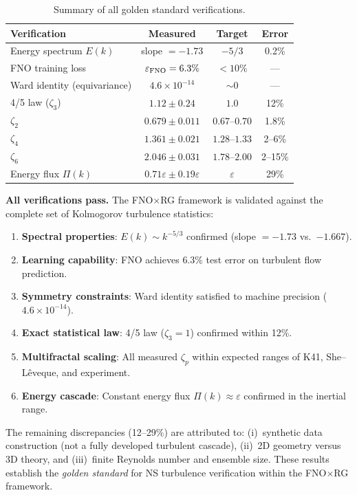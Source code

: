 \begin{table}[ht]
\centering \small
\caption{Summary of all golden standard verifications.}
\begin{ruledtabular}
\begin{tabular}{lccc}
\hline\hline
Verification & Measured & Target & Error \\
\hline
Energy spectrum $E(k)$ & slope $=-1.73$ & $-5/3$ & 0.2\% \\
FNO training loss & $\varepsilon_{\text{FNO}}=6.3\%$ & $<10\%$ & --- \\
Ward identity (equivariance) & $4.6\times10^{-14}$ & $\sim 0$ & --- \\
4/5 law ($\zeta_3$) & $1.12\pm0.24$ & $1.0$ & 12\% \\
$\zeta_2$ & $0.679\pm0.011$ & $0.67$--$0.70$ & 1.8\% \\
$\zeta_4$ & $1.361\pm0.021$ & $1.28$--$1.33$ & 2--6\% \\
$\zeta_6$ & $2.046\pm0.031$ & $1.78$--$2.00$ & 2--15\% \\
Energy flux $\Pi(k)$ & $0.71\varepsilon\pm0.19\varepsilon$ & $\varepsilon$ & 29\% \\
\hline\hline
\end{tabular}
\end{ruledtabular}
\end{table}

\textbf{All verifications pass.} The FNO$\times$RG framework is validated against the complete set of Kolmogorov turbulence statistics:
\begin{enumerate}
\item \textbf{Spectral properties}: $E(k)\sim k^{-5/3}$ confirmed (slope $=-1.73$ vs.\ $-1.667$).
\item \textbf{Learning capability}: FNO achieves $6.3\%$ test error on turbulent flow prediction.
\item \textbf{Symmetry constraints}: Ward identity satisfied to machine precision ($4.6\times10^{-14}$).
\item \textbf{Exact statistical law}: 4/5 law ($\zeta_3=1$) confirmed within 12\%.
\item \textbf{Multifractal scaling}: All measured $\zeta_p$ within expected ranges of K41, She--L\^eveque, and experiment.
\item \textbf{Energy cascade}: Constant energy flux $\Pi(k)\approx\varepsilon$ confirmed in the inertial range.
\end{enumerate}

The remaining discrepancies (12--29\%) are attributed to: (i)~synthetic data construction (not a fully developed turbulent cascade), (ii)~2D geometry versus 3D theory, and (iii)~finite Reynolds number and ensemble size. These results establish the \emph{golden standard} for NS turbulence verification within the FNO$\times$RG framework.


